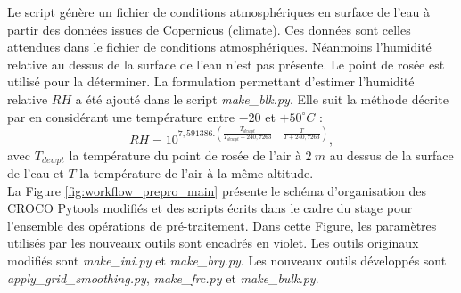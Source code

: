 \documentclass[10pt,a4paper,titlepage]{article}
\begin{document}
Le script génère un fichier de conditions atmosphériques en surface de l'eau à partir des données issues de Copernicus (climate).
Ces données sont celles attendues dans le fichier de conditions atmosphériques.
Néanmoins l'humidité relative au dessus de la surface de l'eau n'est pas présente.
Le point de rosée est utilisé pour la déterminer.
La formulation permettant d'estimer l'humidité relative $RH$ a été ajouté dans le script \textit{make\_blk.py}.
Elle suit la méthode décrite par \cite{humidity_formulation} en considérant une température entre $-20$ et $+50 ^\circ C$ :
$$RH = 10^{7,591386.(\frac{T_{dewpt}}{T_{dewpt}+240,7263}-\frac{T}{T+240,7263})},$$
avec $T_{dewpt}$ la température du point de rosée de l'air à $2~m$ au dessus de la surface de l'eau et $T$ la température de l'air à la même altitude.\\




La Figure \ref{fig:workflow_prepro_main} présente le schéma d'organisation des CROCO Pytools modifiés et des scripts écrits dans le cadre du stage pour l'ensemble des opérations de pré-traitement.
Dans cette Figure, les paramètres utilisés par les nouveaux outils sont encadrés en violet.
Les outils originaux modifiés sont \textit{make\_ini.py} et \textit{make\_bry.py}.
Les nouveaux outils développés sont \textit{apply\_grid\_smoothing.py}, \textit{make\_frc.py} et \textit{make\_bulk.py}.
\end{document}
